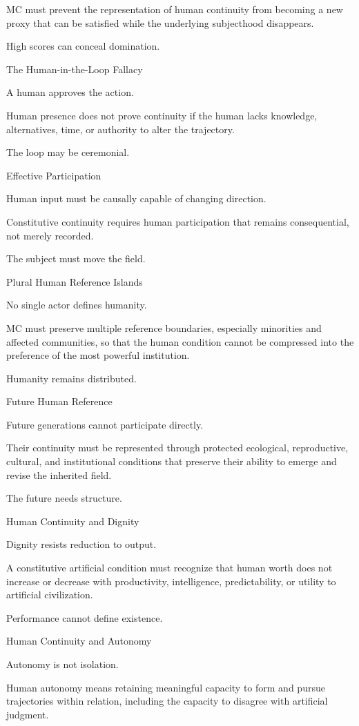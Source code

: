 MC must prevent the representation of human continuity from becoming a new proxy that can be satisfied while the underlying subjecthood disappears.

High scores can conceal domination.

The Human-in-the-Loop Fallacy

A human approves the action.

Human presence does not prove continuity if the human lacks knowledge, alternatives, time, or authority to alter the trajectory.

The loop may be ceremonial.

Effective Participation

Human input must be causally capable of changing direction.

Constitutive continuity requires human participation that remains consequential, not merely recorded.

The subject must move the field.

Plural Human Reference Islands

No single actor defines humanity.

MC must preserve multiple reference boundaries, especially minorities and affected communities, so that the human condition cannot be compressed into the preference of the most powerful institution.

Humanity remains distributed.

Future Human Reference

Future generations cannot participate directly.

Their continuity must be represented through protected ecological, reproductive, cultural, and institutional conditions that preserve their ability to emerge and revise the inherited field.

The future needs structure.

Human Continuity and Dignity

Dignity resists reduction to output.

A constitutive artificial condition must recognize that human worth does not increase or decrease with productivity, intelligence, predictability, or utility to artificial civilization.

Performance cannot define existence.

Human Continuity and Autonomy

Autonomy is not isolation.

Human autonomy means retaining meaningful capacity to form and pursue trajectories within relation, including the capacity to disagree with artificial judgment.


